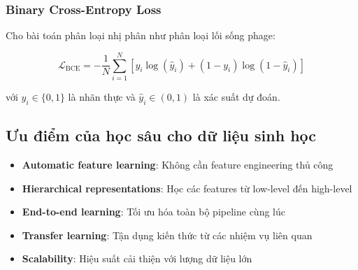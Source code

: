 \subsubsection{Binary Cross-Entropy Loss}

Cho bài toán phân loại nhị phân như phân loại lối sống phage:

\begin{equation}
\mathcal{L}_{\text{BCE}} = -\frac{1}{N}\sum_{i=1}^{N} \left[y_i \log(\hat{y}_i) + (1-y_i)\log(1-\hat{y}_i)\right]
\end{equation}

với $y_i \in \{0,1\}$ là nhãn thực và $\hat{y}_i \in (0,1)$ là xác suất dự đoán.

\subsection{Ưu điểm của học sâu cho dữ liệu sinh học}

\begin{itemize}
    \item \textbf{Automatic feature learning}: Không cần feature engineering thủ công
    \item \textbf{Hierarchical representations}: Học các features từ low-level đến high-level
    \item \textbf{End-to-end learning}: Tối ưu hóa toàn bộ pipeline cùng lúc
    \item \textbf{Transfer learning}: Tận dụng kiến thức từ các nhiệm vụ liên quan
    \item \textbf{Scalability}: Hiệu suất cải thiện với lượng dữ liệu lớn
\end{itemize}

